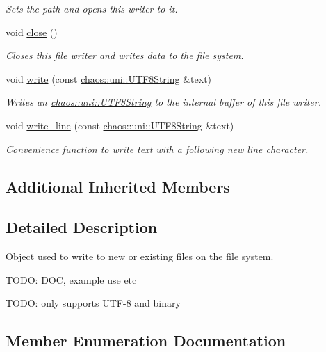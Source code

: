 \begin{DoxyCompactItemize}
\begin{DoxyCompactList}\small\item\em Sets the path and opens this writer to it. \end{DoxyCompactList}\item 
void \hyperlink{classchaos_1_1io_1_1sys_1_1_file_writer_ad5b7240d9d4856d6e2b8ddf99a11bced}{close} ()
\begin{DoxyCompactList}\small\item\em Closes this file writer and writes data to the file system. \end{DoxyCompactList}\item 
void \hyperlink{classchaos_1_1io_1_1sys_1_1_file_writer_adb940c8094f94604f78879b3901584d4}{write} (const \hyperlink{classchaos_1_1uni_1_1_u_t_f8_string}{chaos\+::uni\+::\+U\+T\+F8\+String} \&text)
\begin{DoxyCompactList}\small\item\em Writes an \hyperlink{classchaos_1_1uni_1_1_u_t_f8_string}{chaos\+::uni\+::\+U\+T\+F8\+String} to the internal buffer of this file writer. \end{DoxyCompactList}\item 
void \hyperlink{classchaos_1_1io_1_1sys_1_1_file_writer_a76915355409987ffb0a8376e76fda7ca}{write\+\_\+line} (const \hyperlink{classchaos_1_1uni_1_1_u_t_f8_string}{chaos\+::uni\+::\+U\+T\+F8\+String} \&text)
\begin{DoxyCompactList}\small\item\em Convenience function to write text with a following new line character. \end{DoxyCompactList}\end{DoxyCompactItemize}
\subsection*{Additional Inherited Members}


\subsection{Detailed Description}
Object used to write to new or existing files on the file system. 

T\+O\+D\+O\+: D\+O\+C, example use etc

T\+O\+D\+O\+: only supports U\+T\+F-\/8 and binary 

\subsection{Member Enumeration Documentation}
\hypertarget{classchaos_1_1io_1_1sys_1_1_file_writer_aafcaef6dd3171373d8dfadadcc3c1b0b}{}
